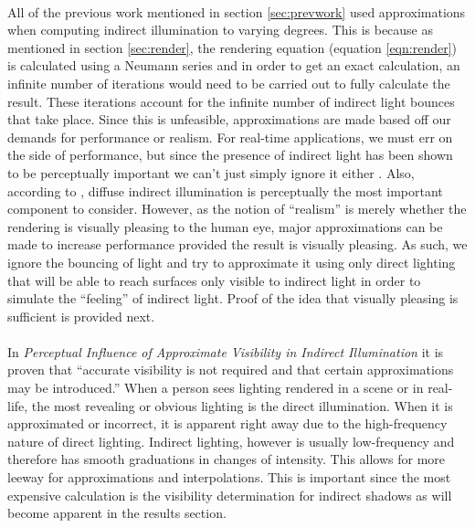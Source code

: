 \paragraph{}
All of the previous work mentioned in section \ref{sec:prevwork} used approximations when computing indirect illumination to varying degrees.  This is because as mentioned in section \ref{sec:render}, the rendering equation (equation \ref{eqn:render}) is calculated using a Neumann series and in order to get an exact calculation, an infinite number of iterations would need to be carried out to fully calculate the result.  These iterations account for the infinite number of indirect light bounces that take place.  Since this is unfeasible, approximations are made based off our demands for performance or realism.  For real-time applications, we must err on the side of performance, but since the presence of indirect light has been shown to be perceptually important we can't just simply ignore it either \cite{Stokes2004}.  Also, according to \cite{Stokes2004}, diffuse indirect illumination is perceptually the most important component to consider.  However, as the notion of “realism” is merely whether the rendering is visually pleasing to the human eye, major approximations can be made to increase performance provided the result is visually pleasing.  As such, we ignore the bouncing of light and try to approximate it using only direct lighting that will be able to reach surfaces only visible to indirect light in order to simulate the ``feeling'' of indirect light.  Proof of the idea that visually pleasing is sufficient is provided next.

\paragraph{}
In \textit{Perceptual Influence of Approximate Visibility in Indirect Illumination} \cite{Yu2009} it is proven that “accurate visibility is not required and that certain approximations may be introduced.”  When a person sees lighting rendered in a scene or in real-life, the most revealing or obvious lighting is the direct illumination.  When it is approximated or incorrect, it is apparent right away due to the high-frequency nature of direct lighting.  Indirect lighting, however is usually low-frequency and therefore has smooth graduations in changes of intensity.  This allows for more leeway for approximations and interpolations.  This is important since the most expensive calculation is the visibility determination for indirect shadows as will become apparent in the results section.  

